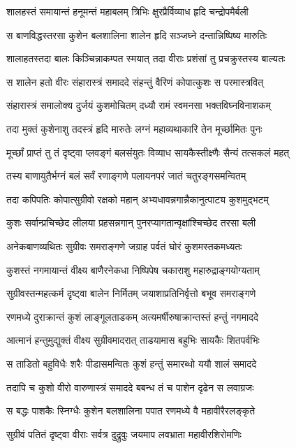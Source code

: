 \twolineshloka
{शालहस्तं समायान्तं हनूमन्तं महाबलम्}
{त्रिभिः क्षुरप्रैर्विव्याध हृदि चन्द्रोपमैर्बली}%

\twolineshloka
{स बाणविद्धस्तरसा कुशेन बलशालिना}
{शालेन हृदि सञ्जघ्ने दन्तान्निष्पिष्य मारुतिः}%

\twolineshloka
{शालाहतस्तदा बालः किञ्चिन्नाकम्पत स्मयात्}
{तदा वीराः प्रशंसां तु प्रचक्रुस्तस्य बाल्यतः}%

\twolineshloka
{स शालेन हतो वीरः संहारास्त्रं समाददे}
{संहन्तुं वैरिणं कोपात्कुशः स परमास्त्रवित्}%

\twolineshloka
{संहारास्त्रं समालोक्य दुर्जयं कुशमोचितम्}
{दध्यौ रामं स्वमनसा भक्तविघ्नविनाशकम्}%

\twolineshloka
{तदा मुक्तं कुशेनाशु तदस्त्रं हृदि मारुतेः}
{लग्नं महाव्यथाकारि तेन मूर्च्छामितः पुनः}%

\twolineshloka
{मूर्च्छां प्राप्तं तु तं दृष्ट्वा प्लवङ्गं बलसंयुतः}
{विव्याध सायकैस्तीक्ष्णैः सैन्यं तत्सकलं महत्}%

\twolineshloka
{तस्य बाणायुतैर्भग्नं बलं सर्वं रणाङ्गणे}
{पलायनपरं जातं चतुरङ्गसमन्वितम्}%

\twolineshloka
{तदा कपिपतिः कोपात्सुग्रीवो रक्षको महान्}
{अभ्यधावन्नगान्नैकानुत्पाट्य कुशमुद्भटम्}%

\twolineshloka
{कुशः सर्वान्प्रचिच्छेद लीलया प्रहसन्नगान्}
{पुनरप्यागतान्वृक्षांश्चिच्छेद तरसा बली}%

\twolineshloka
{अनेकबाणव्यथितः सुग्रीवः समराङ्गणे}
{जग्राह पर्वतं घोरं कुशमस्तकमध्यतः}%

\twolineshloka
{कुशस्तं नगमायान्तं वीक्ष्य बाणैरनेकधा}
{निष्पिपेष चकाराशु महारुद्राङ्गयोग्यताम्}%

\twolineshloka
{सुग्रीवस्तन्महत्कर्म दृष्ट्वा बालेन निर्मितम्}
{जयाशाप्रतिनिर्वृत्तो बभूव समराङ्गणे}%

\twolineshloka
{रणमध्ये दुराक्रान्तं कुशं लाङ्गूलताडकम्}
{अत्यमर्षीरुषाक्रान्तस्तं हन्तुं नगमाददे}%

\twolineshloka
{आत्मानं हन्तुमुद्युक्तं वीक्ष्य सुग्रीवमादरात्}
{ताडयामास बहुभिः सायकैः शितपर्वभिः}%

\twolineshloka
{स ताडितो बहुविधैः शरैः पीडासमन्वितः}
{कुशं हन्तुं समारब्धो ययौ शालं समाददे}%

\twolineshloka
{तदापि च कुशो वीरो वारुणास्त्रं समाददे}
{बबन्ध तं च पाशेन दृढेन स लवाग्रजः}%

\twolineshloka
{स बद्धः पाशकैः स्निग्धैः कुशेन बलशालिना}
{पपात रणमध्ये वै महावीरैरलङ्कृते}%

\twolineshloka
{सुग्रीवं पतितं दृष्ट्वा वीराः सर्वत्र दुद्रुवुः}
{जयमाप लवभ्राता महावीरशिरोमणिः}%


